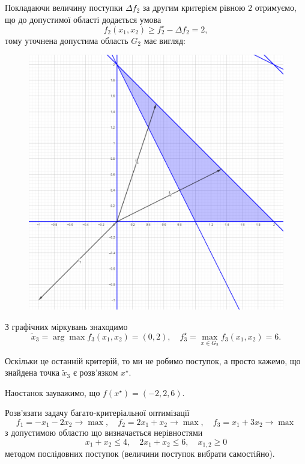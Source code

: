 \begin{solution}
    Покладаючи величину поступки $\Delta f_2$ за другим критерієм рівною $2$ отримуємо, що до допустимої області додається умова \[ f_2(x_1, x_2) \ge f_2^\star - \Delta f_2 = 2, \] тому уточнена допустима область $G_2$ має вигляд:
    \begin{figure}[H]
        \centering
        \includegraphics[width=\textwidth]{img/successive_concessions_1_3.png}
    \end{figure}

    З графічних міркувань знаходимо \[ \tilde x_3 = \arg \max f_3(x_1, x_2) = (0, 2), \quad f_3^\star = \max_{x \in G_2} f_3(x_1, x_2) = 6. \]
    
    Оскільки це останній критерій, то ми не робимо поступок, а просто кажемо, що знайдена точка $\tilde x_3$ є розв'язком $x^\star$. \medskip
    
    Наостанок зауважимо, що $f(x^\star) = (-2, 2, 6)$.
\end{solution}

\newpage

\begin{problem}
    Розв'язати задачу багато-критеріальної оптимізації \[ f_1 = - x_1 - 2 x_2 \to \max, \quad f_2 = 2 x_1 + x_2 \to \max, \quad f_3 = x_1 + 3 x_2 \to \max \] з допустимою областю що визначається нерівностями \[ x_1 + x_2 \le 4, \quad 2 x_1 + x_2 \le 6, \quad x_{1, 2} \ge 0 \] методом послідовних поступок (величини поступок вибрати самостійно).
\end{problem}

